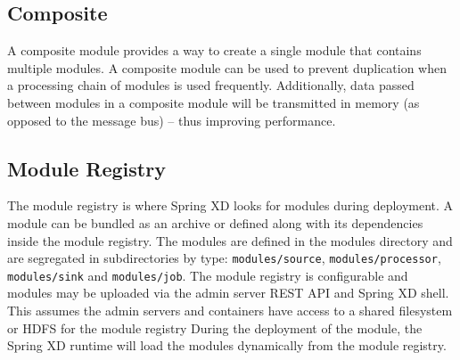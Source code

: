 \subsection{Composite}
A composite module provides a way to create a single module that contains
multiple modules. A composite module can be used to prevent
duplication when a processing chain of modules is used frequently.
Additionally, data passed between modules in a composite module will be
transmitted in memory (as opposed to the message bus) -- thus improving
performance.

\par

\subsection{Module Registry}
The module registry is where Spring XD looks for modules during
deployment. A module can be bundled as an archive or defined along with its
dependencies inside the module registry. The modules are defined in
the modules directory and are segregated in subdirectories by
type: \texttt{modules/source}, \texttt{modules/processor},
\texttt{modules/sink} and \texttt{modules/job}. The module registry is
configurable and modules may be uploaded via the admin server REST API
and Spring XD shell.
This assumes  the admin servers and containers have access to a shared 
filesystem or HDFS for the module registry
During the deployment of the module, the Spring XD runtime will load the modules
dynamically from the module registry.
